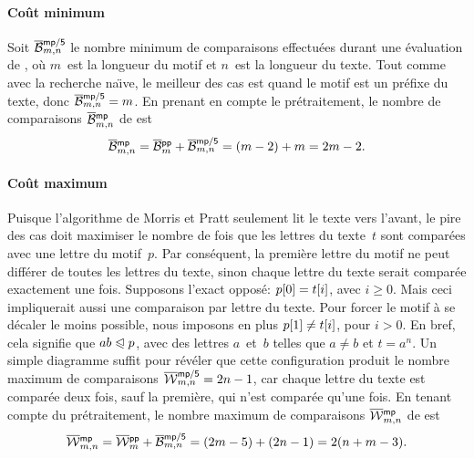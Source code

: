 \paragraph{Coût minimum}

Soit
\(\smash[t]{\OB{\fun{mp/5}}{m,n}}\)
le nombre minimum de comparaisons effectuées durant une évaluation de
, où \(m\)~est la longueur du motif et \(n\)~est la longueur
du texte. Tout comme avec la recherche na\"{\i}ve, le meilleur des cas
est quand le motif est un préfixe du texte, donc
\(\OB{\fun{mp/5}}{m,n} = m\). En prenant en compte le prétraitement,
le nombre de comparaisons
\(\OB{\fun{mp}}{m,n}\) de
 est
\begin{equation*}
\belowdisplayskip=0pt
\OB{\fun{mp}}{m,n} = \OB{\fun{pp}}{m} + \OB{\fun{mp/5}}{m,n} = (m-2)
+ m = 2m - 2.
\end{equation*}

\vspace*{-10pt}

\paragraph{Coût maximum}

Puisque l'algorithme de Morris et Pratt seulement lit le texte vers
l'avant, le pire des cas doit maximiser le nombre de fois que les
lettres du texte~\(t\) sont comparées avec une lettre du
motif~\(p\). Par conséquent, la première lettre du motif ne peut
différer de toutes les lettres du texte, sinon chaque lettre du texte
serait comparée exactement une fois. Supposons l'exact opposé:
\({p}[{0}] = {t}[{i}]\), avec \(i \geqslant 0\). Mais ceci
impliquerait aussi une comparaison par lettre du texte. Pour forcer le
motif à se décaler le moins possible, nous imposons en plus
\({p}[{1}] \neq {t}[{i}]\), pour \(i>0\). En bref, cela signifie
que \(ab \mathrel{\trianglelefteqslant} p\), avec des lettres \(a\)~et~\(b\) telles que \(a
\neq b\) et \(t=a^n\). Un simple diagramme suffit pour révéler que
cette configuration produit le nombre maximum de comparaisons
\(\OW{\fun{mp/5}}{m,n} = 2n - 1\),
car chaque lettre du texte est comparée deux fois, sauf la première,
qui n'est comparée qu'une fois. En tenant compte du prétraitement, le
nombre maximum de comparaisons \(\OW{\fun{mp}}{m,n}\)
 de  est
\begin{equation*}
\belowdisplayskip=0pt
\OW{\fun{mp}}{m,n} = \OW{\fun{pp}}{m} + \OB{\fun{mp/5}}{m,n} = (2m-5)
+ (2n-1) = 2(n + m - 3).
\end{equation*}

